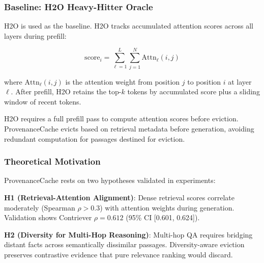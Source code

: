 \subsubsection{Baseline: H2O Heavy-Hitter Oracle}

H2O \citep{zhang2023h2o} is used as the baseline. H2O tracks accumulated attention scores across all layers during prefill:

$$
\text{score}_i = \sum_{\ell=1}^{L} \sum_{j=1}^{N} \text{Attn}_\ell(i, j)
$$

where $\text{Attn}_\ell(i, j)$ is the attention weight from position $j$ to position $i$ at layer $\ell$. After prefill, H2O retains the top-$k$ tokens by accumulated score plus a sliding window of recent tokens.

H2O requires a full prefill pass to compute attention scores before eviction. ProvenanceCache evicts based on retrieval metadata before generation, avoiding redundant computation for passages destined for eviction.

\subsubsection{Theoretical Motivation}

ProvenanceCache rests on two hypotheses validated in experiments:

\textbf{H1 (Retrieval-Attention Alignment)}: Dense retrieval scores correlate moderately (Spearman $\rho > 0.3$) with attention weights during generation. Validation shows Contriever $\rho = 0.612$ (95\% CI [0.601, 0.624]).

\textbf{H2 (Diversity for Multi-Hop Reasoning)}: Multi-hop QA requires bridging distant facts across semantically dissimilar passages. Diversity-aware eviction preserves contrastive evidence that pure relevance ranking would discard.
